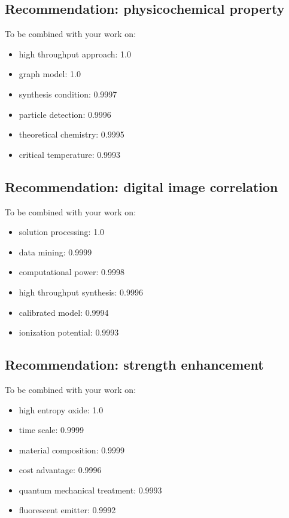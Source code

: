 \documentclass{article}%
\begin{document}
%
\subsection{Recommendation: physicochemical property}%
\label{subsec:Recommendationphysicochemicalproperty}%
To be combined with your work on:%
\begin{itemize}%
\item%
high throughput approach: 1.0%
\item%
graph model: 1.0%
\item%
synthesis condition: 0.9997%
\item%
particle detection: 0.9996%
\item%
theoretical chemistry: 0.9995%
\item%
critical temperature: 0.9993%
\end{itemize}

%
\subsection{Recommendation: digital image correlation}%
\label{subsec:Recommendationdigitalimagecorrelation}%
To be combined with your work on:%
\begin{itemize}%
\item%
solution processing: 1.0%
\item%
data mining: 0.9999%
\item%
computational power: 0.9998%
\item%
high throughput synthesis: 0.9996%
\item%
calibrated model: 0.9994%
\item%
ionization potential: 0.9993%
\end{itemize}

%
\subsection{Recommendation: strength enhancement}%
\label{subsec:Recommendationstrengthenhancement}%
To be combined with your work on:%
\begin{itemize}%
\item%
high entropy oxide: 1.0%
\item%
time scale: 0.9999%
\item%
material composition: 0.9999%
\item%
cost advantage: 0.9996%
\item%
quantum mechanical treatment: 0.9993%
\item%
fluorescent emitter: 0.9992%
\end{itemize}
\end{document}

